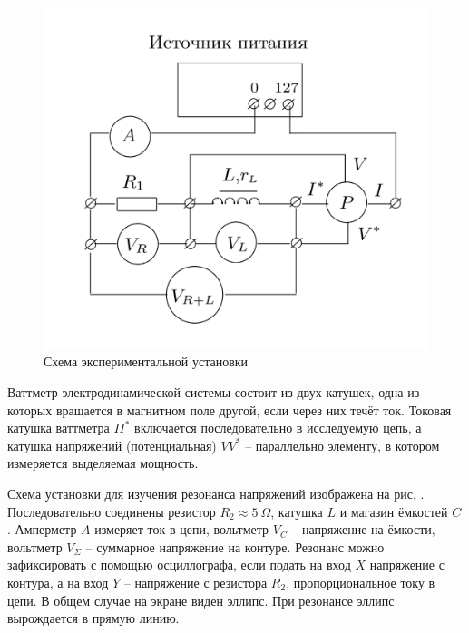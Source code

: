 \documentclass[a4paper,10pt]{article}
\begin{document}
\begin{figure}[h]
	\centering
	\includegraphics[scale=0.35]{Device}
	\caption{Схема экспериментальной установки} \label{Device}
\end{figure}

Ваттметр электродинамической системы состоит из двух катушек, одна из которых вращается в магнитном поле другой, если через них течёт ток. Токовая катушка ваттметра $II^*$ включается последовательно в исследуемую цепь, а катушка напряжений (потенциальная) $VV^*$ -- параллельно элементу, в котором измеряется выделяемая мощность.

Схема установки для изучения резонанса напряжений изображена на рис. . Последовательно соединены резистор $R_2\approx5~\Omega$, катушка $L$ и магазин ёмкостей $C$. Амперметр $A$ измеряет ток в цепи, вольтметр $V_C$ -- напряжение на ёмкости, вольтметр $V_{\Sigma}$ -- суммарное напряжение на контуре. Резонанс можно зафиксировать с помощью осциллографа, если подать на вход $X$ напряжение с контура, а на вход $Y$ -- напряжение с резистора $R_2$, пропорциональное току в цепи. В общем случае на экране виден эллипс. При резонансе эллипс вырождается в прямую линию.
\end{document}
